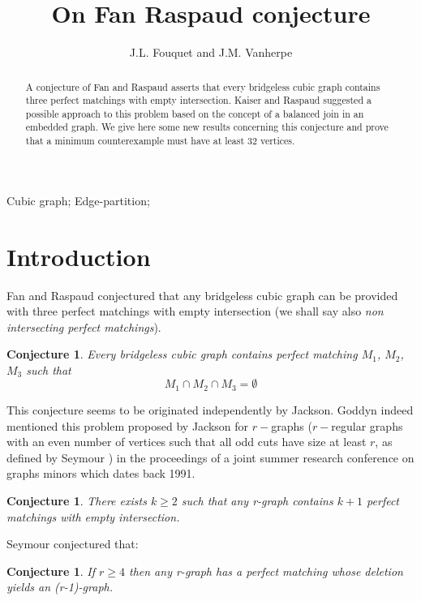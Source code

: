 \documentclass{elsart}
\theoremstyle{plain} \theoremheaderfont{\scshape}
\newtheorem{Conj}[Thm]{{\bf Conjecture}}
\begin{document}
\begin{frontmatter}




\title{On Fan Raspaud conjecture}
\author{J.L. Fouquet and J.M. Vanherpe}


\address{L.I.F.O., Facult\'e des Sciences, B.P. 6759 \\
Universit\'e d'Orl\'eans, 45067 Orl\'eans Cedex 2, FR}
\begin{abstract}
A conjecture of Fan and Raspaud \cite{FanRas} asserts that every
bridgeless cubic graph contains three perfect matchings with empty
intersection. Kaiser and Raspaud \cite{KaiRas} suggested a possible
approach to this problem based on the concept of a balanced join in
an embedded graph. We give here some new results concerning this
conjecture and prove that a minimum counterexample must have at
least $32$ vertices.
\end{abstract}
\begin{keyword}
Cubic graph;  Edge-partition;
\end{keyword}
\end{frontmatter}




\section{Introduction}
Fan and Raspaud \cite{FanRas} conjectured that any bridgeless cubic
graph can be provided with three perfect matchings with empty
intersection (we shall say also {\em non intersecting perfect
matchings}).
\begin{Conj}\cite{FanRas} \label{Conjecture:FanRaspaud} Every
bridgeless cubic graph contains perfect matching $M_1$, $M_2$, $M_3$
such that
$$M_1 \cap M_2 \cap M_3 = \emptyset$$
\end{Conj}

This conjecture seems to be originated independently by Jackson.
Goddyn \cite{God} indeed mentioned this problem proposed by Jackson
for $r-$graphs ($r-$regular graphs with an even number of vertices
such that all odd cuts have size at least $r$, as defined by Seymour
\cite{Sey}) in the proceedings of a joint summer research conference
on graphs minors which dates back 1991.

\begin{Conj}\cite{God} \label{Conjecture:Jackson}There exists $k \geq 2$ such
that any r-graph contains $k+1$ perfect matchings with empty
intersection.
\end{Conj}
Seymour \cite{Sey} conjectured that:
\begin{Conj}\cite{Sey} \label{Conjecture:Seymour}If $r \geq 4$ then any
r-graph has a perfect matching whose deletion yields an (r-1)-graph.
\end{Conj}
\end{document}
